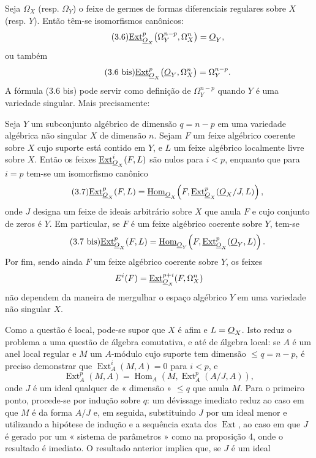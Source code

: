 Seja $\Omega_X$ (resp. $\Omega_Y$) o feixe de germes de formas
diferenciais regulares sobre $X$ (resp. $Y$). Então têm-se isomorfismos
canônicos:
\begin{equation}\tag{3.6}
  \underline{\operatorname{Ext}}_{\underline{O}_X}^{p}\bigl(\Omega_Y^{n-p},\Omega_X^{n}\bigr)=\underline{O}_Y,
\end{equation}
ou também
\begin{equation}\tag{3.6 bis}
  \underline{\operatorname{Ext}}_{\underline{O}_X}^{p}\bigl(\underline{O}_Y,\Omega_X^{n}\bigr)=\Omega_Y^{n-p}.
\end{equation}
A fórmula (3.6 bis) pode servir como definição de $\Omega_Y^{n-p}$ quando $Y$
é uma variedade singular. Mais precisamente:

 Seja $Y$ um subconjunto algébrico de dimensão
$q=n-p$ em uma variedade algébrica não singular $X$ de dimensão $n$. Sejam
$F$ um feixe algébrico coerente sobre $X$ cujo suporte está contido em $Y$, e $L$
um feixe algébrico localmente livre sobre $X$. Então os feixes
$\underline{\operatorname{Ext}}_{\underline{O}_X}^{i}(F,L)$ são nulos para $i<p$, enquanto que para $i=p$ tem-se um
isomorfismo canônico
\begin{equation}\tag{3.7}
  \underline{\operatorname{Ext}}_{\underline{O}_X}^{p}(F,L)
  =\underline{\operatorname{Hom}}_{\underline{O}_X}\!\left(F,
  \underline{\operatorname{Ext}}_{\underline{O}_X}^{p}(\underline{O}_X/J,L)\right),
\end{equation}
onde $J$ designa um feixe de ideais arbitrário sobre $X$ que anula $F$ e cujo
conjunto de zeros é $Y$. Em particular, se $F$ é um feixe algébrico
coerente sobre $Y$, tem-se
\begin{equation}\tag{3.7 bis}
  \underline{\operatorname{Ext}}_{\underline{O}_X}^{p}(F,L)
  =\underline{\operatorname{Hom}}_{\underline{O}_Y}\!\left(F,\underline{\operatorname{Ext}}_{\underline{O}_X}^{p}(\underline{O}_Y,L)\right).
\end{equation}
Por fim, sendo ainda $F$ um feixe algébrico coerente sobre $Y$, os feixes
\[
  E^{i}(F)=\underline{\operatorname{Ext}}_{\underline{O}_X}^{p+i}(F,\Omega_X^{n})
\]
não dependem da maneira de mergulhar o espaço algébrico $Y$ em uma variedade
não singular $X$.

Como a questão é local, pode-se supor que $X$ é afim e $L=\underline{O}_X$. Isto reduz
o problema a uma questão de álgebra comutativa, e até de álgebra local: se $A$ é um
anel local regular e $M$ um $A$-módulo cujo suporte tem dimensão
$\leq q=n-p$, é preciso demonstrar que $\operatorname{Ext}_{A}^{i}(M,A)=0$ para $i<p$, e
\[
  \operatorname{Ext}_{A}^{p}(M,A)
  =\operatorname{Hom}_{A}\!\left(M,\operatorname{Ext}_{A}^{p}(A/J,A)\right),
\]
onde $J$ é um ideal qualquer de « dimensão » $\leq q$ que anula $M$. Para o
primeiro ponto, procede-se por indução sobre $q$: um dévissage imediato reduz
ao caso em que $M$ é da forma $A/J$ e, em seguida, substituindo $J$ por um ideal menor
e utilizando a hipótese de indução e a sequência exata dos
$\operatorname{Ext}$, ao caso em que $J$ é gerado por um « sistema de parâmetros »
como na proposição 4, onde o resultado é imediato. O resultado
anterior implica que, se $J$ é um ideal

